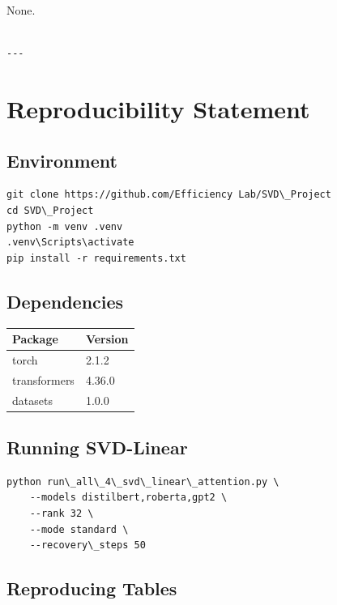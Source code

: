 None.
\begin{lstlisting}

---
\end{lstlisting}


\section{Reproducibility Statement}

\subsection{Environment}

\begin{lstlisting}
git clone https://github.com/Efficiency Lab/SVD\_Project
cd SVD\_Project
python -m venv .venv
.venv\Scripts\activate
pip install -r requirements.txt
\end{lstlisting}

\subsection{Dependencies}

\begin{table}[H]
\centering
\small
\begin{tabular}{ll}
\toprule
\textbf{Package} & \textbf{Version} \\
\midrule
torch & 2.1.2 \\
transformers & 4.36.0 \\
datasets & 1.0.0 \\
\bottomrule
\end{tabular}
\end{table}

\subsection{Running SVD-Linear}

\begin{lstlisting}
python run\_all\_4\_svd\_linear\_attention.py \
    --models distilbert,roberta,gpt2 \
    --rank 32 \
    --mode standard \
    --recovery\_steps 50
\end{lstlisting}

\subsection{Reproducing Tables}

